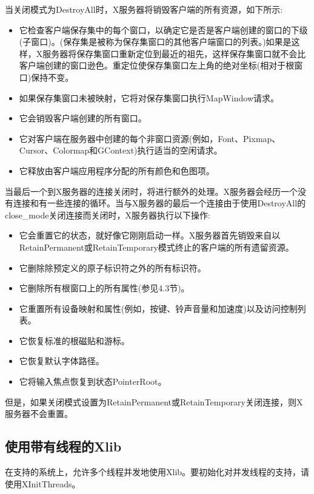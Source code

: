 \noindent 当关闭模式为DestroyAll时，X服务器将销毁客户端的所有资源，如下所示:

\begin{itemize}
\item 它检查客户端保存集中的每个窗口，以确定它是否是客户端创建的窗口的下级(子窗口)。(保存集是被称为保存集窗口的其他客户端窗口的列表。)如果是这样，X服务器将保存集窗口重新定位到最近的祖先，这样保存集窗口就不会比客户端创建的窗口逊色。重定位使保存集窗口左上角的绝对坐标(相对于根窗口)保持不变。
\item 如果保存集窗口未被映射，它将对保存集窗口执行MapWindow请求。
\item 它会销毁客户端创建的所有窗口。
\item 它对客户端在服务器中创建的每个非窗口资源(例如，Font、Pixmap、Cursor、Colormap和GContext)执行适当的空闲请求。
\item 它释放由客户端应用程序分配的所有颜色和色图项。
\end{itemize}

当最后一个到X服务器的连接关闭时，将进行额外的处理。X服务器会经历一个没有连接和有一些连接的循环。当与X服务器的最后一个连接由于使用DestroyAll的close\_mode关闭连接而关闭时，X服务器执行以下操作:

\begin{itemize}
\item 它会重置它的状态，就好像它刚刚启动一样。X服务器首先销毁来自以RetainPermanent或RetainTemporary模式终止的客户端的所有遗留资源。
\item 它删除除预定义的原子标识符之外的所有标识符。
\item 它删除所有根窗口上的所有属性(参见4.3节)。
\item 它重置所有设备映射和属性(例如，按键、铃声音量和加速度)以及访问控制列表。
\item 它恢复标准的根磁贴和游标。
\item 它恢复默认字体路径。
\item 它将输入焦点恢复到状态PointerRoot。
\end{itemize}

\noindent 但是，如果关闭模式设置为RetainPermanent或RetainTemporary关闭连接，则X服务器不会重置。

\subsection{使用带有线程的Xlib}

\noindent 在支持的系统上，允许多个线程并发地使用Xlib。要初始化对并发线程的支持，请使用XInitThreads。

